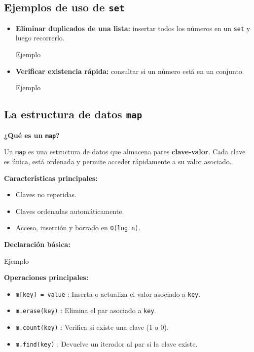 \documentclass{article}
\newcommand{\cppfile}[2][]{
    \begin{container}{\faCode \space \space  #1}
        
    \end{container}
}
\begin{document}
\subsection{Ejemplos de uso de \texttt{set}}

\begin{itemize}
    \item \textbf{Eliminar duplicados de una lista:} insertar todos los números en un \texttt{set} y luego recorrerlo.
    \cppfile[Ejemplo]{codes/set_ejemplo1.cpp}

    \item \textbf{Verificar existencia rápida:} consultar si un número está en un conjunto.
    \cppfile[Ejemplo]{codes/set_ejemplo2.cpp}
\end{itemize}

\vspace{1.5cm}

\subsection{La estructura de datos \texttt{map}}

\textbf{¿Qué es un \texttt{map}?}

Un \texttt{map} es una estructura de datos que almacena pares \textbf{clave-valor}.  
Cada clave es única, está ordenada y permite acceder rápidamente a su valor asociado.

\textbf{Características principales:}
\begin{itemize}
    \item Claves no repetidas.
    \item Claves ordenadas automáticamente.
    \item Acceso, inserción y borrado en \texttt{O(log n)}.
\end{itemize}

\textbf{Declaración básica:}

\cppfile[Ejemplo]{codes/map1.cpp}

\textbf{Operaciones principales:}
\begin{itemize}
    \item \texttt{m[key] = value} : Inserta o actualiza el valor asociado a \texttt{key}.
    \item \texttt{m.erase(key)} : Elimina el par asociado a \texttt{key}.
    \item \texttt{m.count(key)} : Verifica si existe una clave (1 o 0).
    \item \texttt{m.find(key)} : Devuelve un iterador al par si la clave existe.
\end{itemize}
\end{document}
